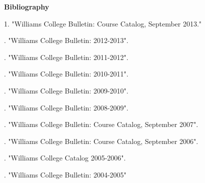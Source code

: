 \documentclass[12pt,a4paper]{article}\usepackage[]{graphicx}\usepackage[]{color}
\theoremstyle{definition}
\begin{document}
\bigskip
\centerline{\bf{Bibliography}}

\bigskip

1. "Williams College Bulletin: Course Catalog, September 2013."

. "Williams College Bulletin: 2012-2013".

. "Williams College Bulletin: 2011-2012".

. "Williams College Bulletin: 2010-2011".

. "Williams College Bulletin: 2009-2010".

. "Williams College Bulletin: 2008-2009".

. "Williams College Bulletin: Course Catalog, September 2007". 

. "Williams College Bulletin: Course Catalog, September 2006".

. "Williams College Catalog 2005-2006".

. "Williams College Bulletin: 2004-2005"
\end{document}
